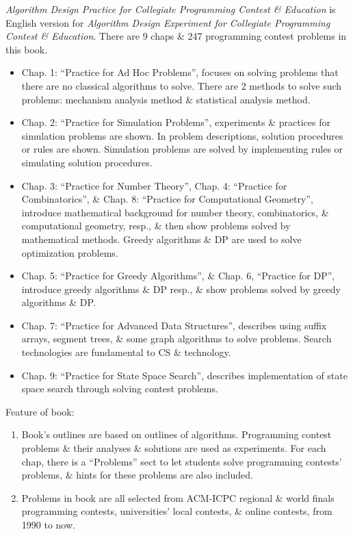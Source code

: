 \documentclass{article}
\begin{document}
\begin{itemize}
	{\it Algorithm Design Practice for Collegiate Programming Contest \& Education} is English version for {\it Algorithm Design Experiment for Collegiate Programming Contest \& Education}. There are 9 chaps \& 247 programming contest problems in this book.
	\begin{itemize}
		\item Chap. 1: ``Practice for Ad Hoc Problems'', focuses on solving problems that there are no classical algorithms to solve. There are 2 methods to solve such problems: mechanism analysis method \& statistical analysis method.
		\item Chap. 2: ``Practice for Simulation Problems'', experiments \& practices for simulation problems are shown. In problem descriptions, solution procedures or rules are shown. Simulation problems are solved by implementing rules or simulating solution procedures.
		\item Chap. 3: ``Practice for Number Theory'', Chap. 4: ``Practice for Combinatorics'', \& Chap. 8: ``Practice for Computational Geometry'', introduce mathematical background for number theory, combinatorics, \& computational geometry, resp., \& then show problems solved by mathematical methods. Greedy algorithms \& DP are used to solve optimization problems.
		\item Chap. 5: ``Practice for Greedy Algorithms'', \& Chap. 6, ``Practice for DP'', introduce greedy algorithms \& DP resp., \& show problems solved by greedy algorithms \& DP.
		\item Chap. 7: ``Practice for Advanced Data Structures'', describes using suffix arrays, segment trees, \& some graph algorithms to solve problems. Search technologies are fundamental to CS \& technology.
		\item Chap. 9: ``Practice for State Space Search'', describes implementation of state space search through solving contest problems.
	\end{itemize}
	Feature of book:
	\begin{enumerate}
		\item Book's outlines are based on outlines of algorithms. Programming contest problems \& their analyses \& solutions are used as experiments. For each chap, there is a ``Problems'' sect to let students solve programming contests' problems, \& hints for these problems are also included.
		\item Problems in book are all selected from ACM-ICPC regional \& world finals programming contests, universities' local contests, \& online contests, from 1990 to now.

\end{enumerate}
\end{itemize}
\end{document}
